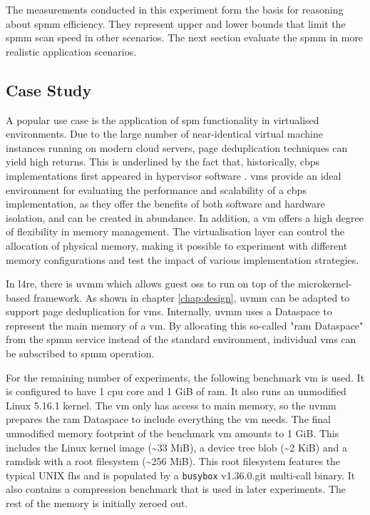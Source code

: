 The measurements conducted in this experiment form the basis for reasoning about \ac{spmm} efficiency.
They represent upper and lower bounds that limit the \ac{spmm} scan speed in other scenarios.
The next section evaluate the \ac{spmm} in more realistic application scenarios.

\subsection{Case Study}
\label{subsec:case-study}

A popular use case is the application of \ac{spm} functionality in virtualised environments.
Due to the large number of near-identical virtual machine instances running on modern cloud servers, page deduplication techniques can yield high returns.
This is underlined by the fact that, historically, \ac{cbps} implementations first appeared in hypervisor software \cite{vmware-tps-patent}.
\Acp{vm} provide an ideal environment for evaluating the performance and scalability of a \ac{cbps} implementation, as they offer the benefits of both software and hardware isolation, and can be created in abundance.
In addition, a \ac{vm} offers a high degree of flexibility in memory management.
The virtualisation layer can control the allocation of physical memory, making it possible to experiment with different memory configurations and test the impact of various implementation strategies.

In \ac{l4re}, there is \ac{uvmm} which allows guest \acp{os} to run on top of the microkernel-based framework.
As shown in chapter \ref{chap:design}, \ac{uvmm} can be adapted to support page deduplication for \acp{vm}.
Internally, \ac{uvmm} uses a Dataspace to represent the main memory of a \ac{vm}.
By allocating this so-called "\acs{ram} Dataspace" from the \ac{spmm} service instead of the standard environment, individual \acp{vm} can be subscribed to \ac{spmm} operation.

For the remaining number of experiments, the following benchmark \ac{vm} is used.
It is configured to have 1 \ac{cpu} core and 1 GiB of \ac{ram}.
It also runs an unmodified Linux 5.16.1 kernel.
The \ac{vm} only has access to main memory, so the \ac{uvmm} prepares the \ac{ram} Dataspace to include everything the \ac{vm} needs.
The final unmodified memory footprint of the benchmark \ac{vm} amounts to 1 GiB.
This includes the Linux kernel image (\textasciitilde{}33 MiB), a device tree blob (\textasciitilde{}2 KiB) and a ramdisk with a root filesystem (\textasciitilde{}256 MiB).
This root filesystem features the typical UNIX \ac{fhs} and is populated by a \texttt{busybox} v1.36.0.git multi-call binary.
It also contains a compression benchmark that is used in later experiments.
The rest of the memory is initially zeroed out.

